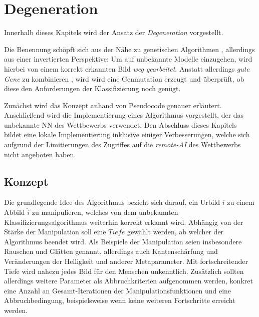 \chapter{Degeneration}
\label{cha:Degeneration}
Innerhalb dieses Kapitels wird der Ansatz der \textit{Degeneration} vorgestellt.

Die Benennung schöpft sich aus der Nähe zu genetischen Algorithmen \cite{heistermann2013genetische}, allerdings aus einer invertierten Perspektive: Um auf unbekannte Modelle einzugehen, wird hierbei von einem korrekt erkannten Bild \textit{weg gearbeitet}. Anstatt allerdings \textit{gute Gene} zu kombinieren \cite{schoneburg1994genetische}, wird wird eine Genmutation erzeugt und überprüft, ob diese den Anforderungen der Klassifizierung noch genügt. 

Zunächst wird das Konzept anhand von Pseudocode genauer erläutert. Anschließend wird die Implementierung eines Algorithmus vorgestellt, der das unbekannte \ac{NN} des Wettbewerbs verwendet. Den Abschluss dieses Kapitels bildet eine lokale Implementierung inklusive einiger Verbesserungen, welche sich aufgrund der Limitierungen des Zugriffes auf die \textit{remote-AI} des Wettbewerbs nicht angeboten haben.
\section{Konzept}
\label{sec:DegenerationKonzept}
Die grundlegende Idee des Algorithmus bezieht sich darauf, ein Urbild $i$ zu einem Abbild $\hat{i}$ zu manipulieren, welches von dem unbekannten Klassifizierungsalgorithmus weiterhin korrekt erkannt wird. Abhängig von der Stärke der Manipulation soll eine $Tiefe$ gewählt werden, ab welcher der Algorithmus beendet wird. Als Beispiele der Manipulation seien insbesondere Rauschen und Glätten genannt, allerdings auch Kantenschärfung und Veränderungen der Helligkeit und anderer Metaparameter. Mit fortschreitender Tiefe wird nahezu jedes Bild für den Menschen unkenntlich. Zusätzlich sollten allerdings weitere Parameter als Abbruchkriterien aufgenommen werden, konkret eine Anzahl an Gesamt-Iterationen der Manipulationsfunktionen und eine Abbruchbedingung, beispielsweise wenn keine weiteren Fortschritte erreicht werden.

\newpage
